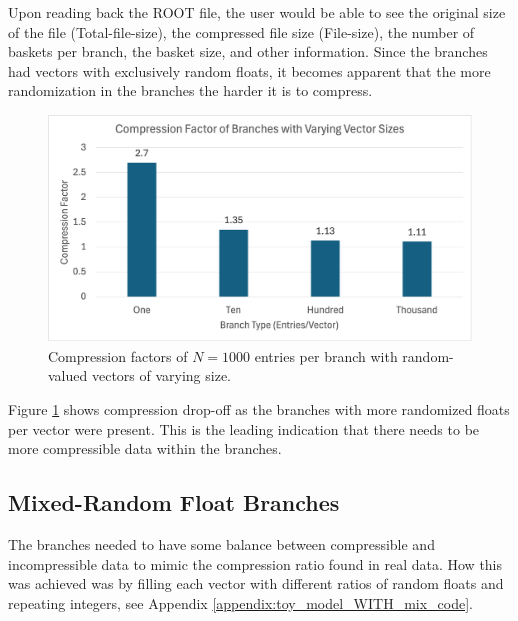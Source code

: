 Upon reading back the ROOT file, the user would be able to see the original size of the file (Total-file-size), the compressed file size (File-size), the number of baskets per branch, the basket size, and other information. 
Since the branches had vectors with exclusively random floats, it becomes apparent that the more randomization in the branches the harder it is to compress. 

\begin{figure}[h]
    \caption{Compression factors of $N=1000$ entries per branch with random-valued vectors of varying size.}
    \label{fig:toymodel_compF_rndm_vectors}
    \centering
    \includegraphics[width=.8\textwidth]{content/toymodel_content/branch_compfacts_nomix.png}
\end{figure}


Figure \ref{fig:toymodel_compF_rndm_vectors} shows compression drop-off as the branches with more randomized floats per vector were present.
This is the leading indication that there needs to be more compressible data within the branches. 

\subsection{Mixed-Random Float Branches}
The branches needed to have some balance between compressible and incompressible data to mimic the compression ratio found in real data.
How this was achieved was by filling each vector with different ratios of random floats and repeating integers, see Appendix \ref{appendix:toy_model_WITH_mix_code}.
